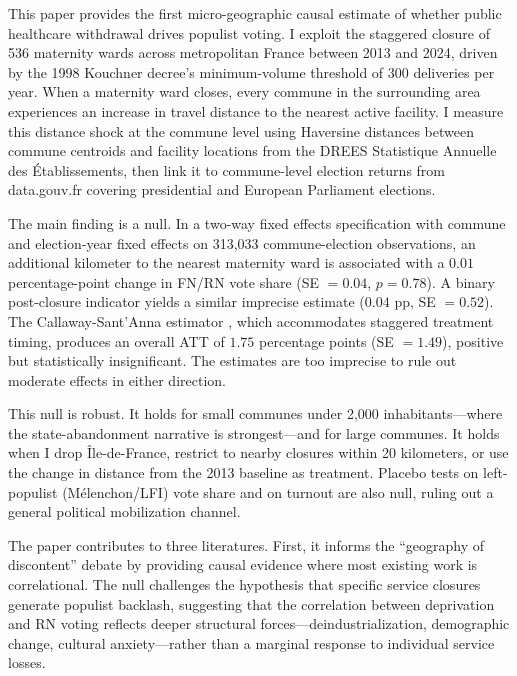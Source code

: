 \documentclass[12pt]{article}
\begin{document}
This paper provides the first micro-geographic causal estimate of whether public healthcare withdrawal drives populist voting. I exploit the staggered closure of 536 maternity wards across metropolitan France between 2013 and 2024, driven by the 1998 Kouchner decree's minimum-volume threshold of 300 deliveries per year. When a maternity ward closes, every commune in the surrounding area experiences an increase in travel distance to the nearest active facility. I measure this distance shock at the commune level using Haversine distances between commune centroids and facility locations from the DREES Statistique Annuelle des \'{E}tablissements, then link it to commune-level election returns from data.gouv.fr covering presidential and European Parliament elections.

The main finding is a null. In a two-way fixed effects specification with commune and election-year fixed effects on 313,033 commune-election observations, an additional kilometer to the nearest maternity ward is associated with a $0.01$ percentage-point change in FN/RN vote share (SE $= 0.04$, $p = 0.78$). A binary post-closure indicator yields a similar imprecise estimate ($0.04$ pp, SE $= 0.52$). The Callaway-Sant'Anna estimator \citep{callaway2021difference}, which accommodates staggered treatment timing, produces an overall ATT of $1.75$ percentage points (SE $= 1.49$), positive but statistically insignificant. The estimates are too imprecise to rule out moderate effects in either direction.

This null is robust. It holds for small communes under 2,000 inhabitants---where the state-abandonment narrative is strongest---and for large communes. It holds when I drop \^{I}le-de-France, restrict to nearby closures within 20 kilometers, or use the change in distance from the 2013 baseline as treatment. Placebo tests on left-populist (M\'{e}lenchon/LFI) vote share and on turnout are also null, ruling out a general political mobilization channel.

The paper contributes to three literatures. First, it informs the ``geography of discontent'' debate \citep{rodriguezpose2018revenge, dijkstra2020geography} by providing causal evidence where most existing work is correlational. The null challenges the hypothesis that specific service closures generate populist backlash, suggesting that the correlation between deprivation and RN voting reflects deeper structural forces---deindustrialization, demographic change, cultural anxiety---rather than a marginal response to individual service losses.
\end{document}
